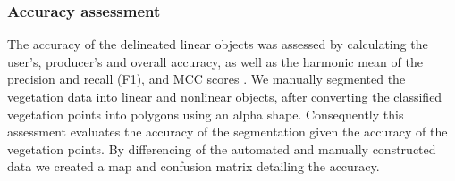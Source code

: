 \subsubsection{Accuracy assessment}
The accuracy of the delineated linear objects was assessed by calculating the user's, producer's and overall accuracy, as well as the harmonic mean of the precision and recall (F1), and MCC scores \citep{congalton2008assessing}. We manually segmented the vegetation data into linear and nonlinear objects, after converting the classified vegetation points into polygons using an alpha shape. Consequently this assessment evaluates the accuracy of the segmentation given the accuracy of the vegetation points. By differencing of the automated and manually constructed data we created a map and confusion matrix detailing the accuracy.